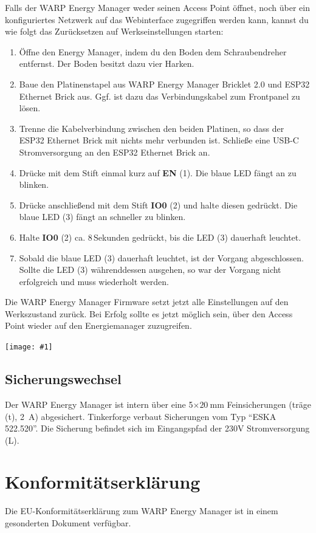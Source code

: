 \documentclass[a4paper,10pt]{article}
\newcommand{\gfx}[1]{\texttt{[image: \#1]}}
\begin{document}
\begin{multicols*}{2}
	Falls der WARP Energy Manager weder seinen Access Point öffnet, noch über ein konfiguriertes Netzwerk auf das Webinterface zugegriffen werden kann,
	kannst du wie folgt das Zurücksetzen auf Werkseinstellungen starten:
	\begin{enumerate}
	 \item Öffne den Energy Manager, indem du den Boden dem Schraubendreher entfernst. Der Boden besitzt dazu vier Harken.
     \item Baue den Platinenstapel aus WARP Energy Manager Bricklet 2.0 und ESP32 Ethernet Brick aus. Ggf. ist dazu das Verbindungskabel zum Frontpanel zu lösen.
     \item Trenne die Kabelverbindung zwischen den beiden Platinen, so dass der ESP32 Ethernet Brick mit nichts mehr verbunden ist. Schließe eine USB-C Stromversorgung an den ESP32 Ethernet Brick an.
	 \item Drücke mit dem Stift einmal kurz auf \textbf{EN} (1). Die blaue LED fängt an zu blinken.
	 \item Drücke anschließend mit dem Stift \textbf{IO0} (2) und halte diesen gedrückt. Die blaue LED (3) fängt an schneller zu blinken.
	 \item Halte \textbf{IO0} (2) ca. 8\,Sekunden gedrückt, bis die LED (3) dauerhaft leuchtet.
	 \item Sobald die blaue LED (3) dauerhaft leuchtet, ist der Vorgang abgeschlossen. Sollte die LED (3) währenddessen ausgehen, so war der Vorgang nicht erfolgreich und muss wiederholt werden.
	\end{enumerate}
	Die WARP Energy Manager Firmware setzt jetzt alle Einstellungen auf den Werkszustand zurück. Bei Erfolg sollte es jetzt möglich sein, über den Access Point wieder auf den Energiemanager zuzugreifen.

	\gfx{./img/resized/factory_reset_2}

	\subsection{Sicherungswechsel}
	Der WARP Energy Manager ist intern über eine 5$\times\SI{20}{\milli\meter}$ Feinsicherungen (träge (t), \SI{2}{\ampere}) abgesichert.
	Tinkerforge verbaut Sicherungen vom Typ \enquote{ESKA 522.520}. Die 
	Sicherung befindet sich im Eingangspfad der 230V Stromversorgung (L).

	\section{Konformitätserklärung}
	Die EU-Konformitätserklärung zum WARP Energy Manager ist in einem gesonderten Dokument verfügbar.


\end{multicols*}
\end{document}
